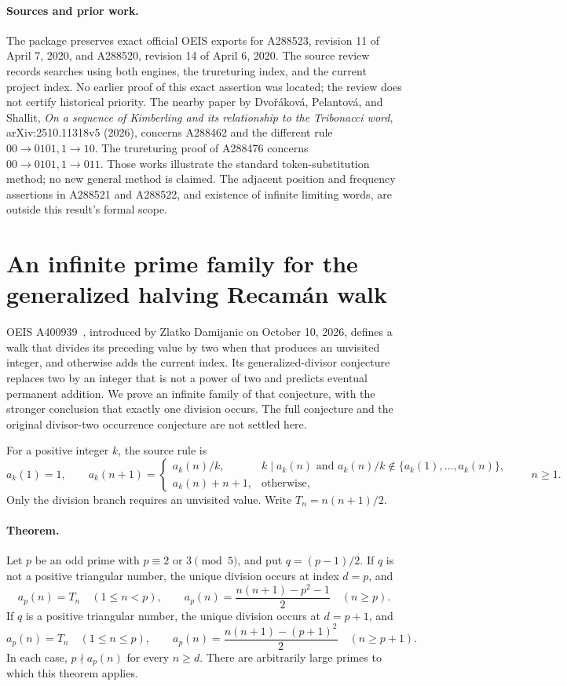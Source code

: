 \documentclass[11pt]{article}
\begin{document}
\paragraph{Sources and prior work.}
The package preserves exact official OEIS exports for A288523,
revision 11 of April 7, 2020, and A288520, revision 14 of April 6, 2020.
The source review records searches using both engines, the trureturing
index, and the current project index. No earlier proof of this exact
assertion was located; the review does not certify historical priority.
The nearby paper by Dvo\v{r}\'akov\'a, Pelantov\'a, and Shallit,
\emph{On a sequence of Kimberling and its relationship to the
Tribonacci word}, arXiv:2510.11318v5 (2026), concerns A288462 and the
different rule $00\to0101,1\to10$. The trureturing proof of A288476
concerns $00\to0101,1\to011$. Those works illustrate the standard
token-substitution method; no new general method is claimed. The
adjacent position and frequency assertions in A288521 and A288522,
and existence of infinite limiting words, are outside this result's
formal scope.

\section{An infinite prime family for the generalized halving Recam\'an walk}
\label{sec:prime-division-recaman}

OEIS A400939~\cite{A400939}, introduced by Zlatko Damijanic on October 10, 2026,
defines a walk that divides its preceding value by two when that produces
an unvisited integer, and otherwise adds the current index. Its
generalized-divisor conjecture replaces two by an integer that is not a
power of two and predicts eventual permanent addition. We prove an
infinite family of that conjecture, with the stronger conclusion that
exactly one division occurs. The full conjecture and the original
divisor-two occurrence conjecture are not settled here.

For a positive integer $k$, the source rule is
\[
 a_k(1)=1,\qquad
 a_k(n+1)=
 \begin{cases}
  a_k(n)/k,& k\mid a_k(n)\text{ and }
       a_k(n)/k\notin\{a_k(1),\ldots,a_k(n)\},\\
  a_k(n)+n+1,&\text{otherwise},
 \end{cases}
 \qquad n\ge1.
\]
Only the division branch requires an unvisited value. Write
$T_n=n(n+1)/2$.

\paragraph{Theorem.}
Let $p$ be an odd prime with $p\equiv2$ or $3\pmod5$, and put
$q=(p-1)/2$. If $q$ is not a positive triangular number, the unique
division occurs at index $d=p$, and
\[
 a_p(n)=T_n\quad(1\le n<p),\qquad
 a_p(n)=\frac{n(n+1)-p^2-1}{2}\quad(n\ge p).
\]
If $q$ is a positive triangular number, the unique division occurs at
$d=p+1$, and
\[
 a_p(n)=T_n\quad(1\le n\le p),\qquad
 a_p(n)=\frac{n(n+1)-(p+1)^2}{2}\quad(n\ge p+1).
\]
In each case, $p\nmid a_p(n)$ for every $n\ge d$. There are arbitrarily
large primes to which this theorem applies.
\end{document}
